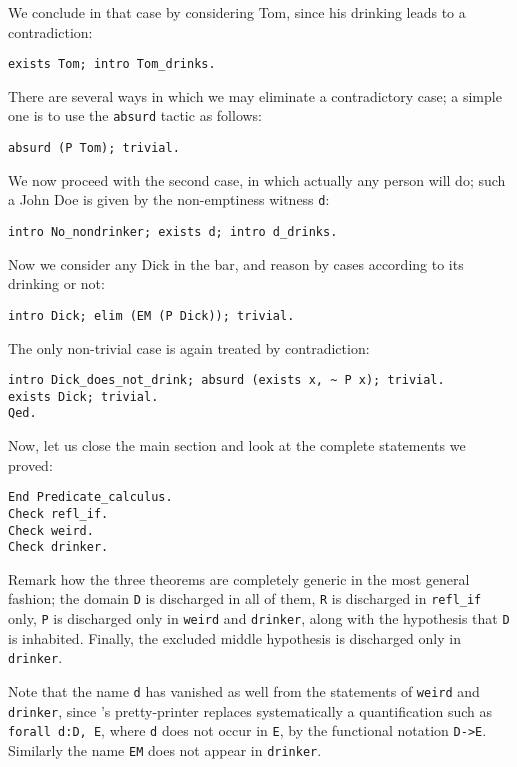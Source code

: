 \documentclass{book}
\begin{document}
We conclude in that case by considering Tom, since his drinking leads to
a contradiction:
\begin{lstlisting}
exists Tom; intro Tom_drinks.
\end{lstlisting}

There are several ways in which we may eliminate a contradictory case;
a simple one is to use the \verb:absurd: tactic as follows:
\begin{lstlisting}
absurd (P Tom); trivial.
\end{lstlisting}

We now proceed with the second case, in which actually any person will do;
such a John Doe is given by the non-emptiness witness \verb:d::
\begin{lstlisting}
intro No_nondrinker; exists d; intro d_drinks.
\end{lstlisting}

Now we consider any Dick in the bar, and reason by cases according to its
drinking or not:
\begin{lstlisting}
intro Dick; elim (EM (P Dick)); trivial.
\end{lstlisting}

The only non-trivial case is again treated by contradiction:
\begin{lstlisting}
intro Dick_does_not_drink; absurd (exists x, ~ P x); trivial.
exists Dick; trivial.
Qed.
\end{lstlisting}

Now, let us close the main section and look at the complete statements
we proved:
\begin{lstlisting}
End Predicate_calculus.
Check refl_if.
Check weird.
Check drinker.
\end{lstlisting}

Remark how the three theorems are completely generic in the most general 
fashion;
the domain \verb:D: is discharged in all of them, \verb:R: is discharged in
\verb:refl_if: only, \verb:P: is discharged only in \verb:weird: and
\verb:drinker:, along with the hypothesis that \verb:D: is inhabited. 
Finally, the excluded middle hypothesis is discharged only in 
\verb:drinker:.

Note that the name \verb:d: has vanished as well from
the statements of \verb:weird: and \verb:drinker:, 
since \Coq's pretty-printer replaces
systematically a quantification such as \verb+forall d:D, E+, where \verb:d:
does not occur in \verb:E:, by the functional notation \verb:D->E:. 
Similarly the name \verb:EM: does not appear in \verb:drinker:. 
\end{document}
